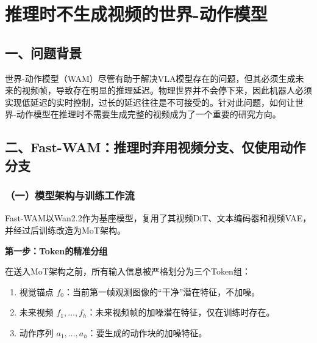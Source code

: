 \clearpage

\hypertarget{ux63a8ux7406ux65f6ux4e0dux751fux6210ux89c6ux9891ux7684ux4e16ux754c-ux52a8ux4f5cux6a21ux578b}{%
\section{推理时不生成视频的世界-动作模型}\label{ux63a8ux7406ux65f6ux4e0dux751fux6210ux89c6ux9891ux7684ux4e16ux754c-ux52a8ux4f5cux6a21ux578b}}

\hypertarget{ux4e00ux95eeux9898ux80ccux666f-10}{%
\subsection{一、问题背景}\label{ux4e00ux95eeux9898ux80ccux666f-10}}

世界-动作模型（WAM）尽管有助于解决VLA模型存在的问题，但其必须生成未来的视频帧，导致存在明显的推理延迟。物理世界并不会停下来，因此机器人必须实现低延迟的实时控制，过长的延迟往往是不可接受的。针对此问题，如何让世界-动作模型在推理时不需要生成完整的视频成为了一个重要的研究方向。

\hypertarget{ux4e8cfast-wamux63a8ux7406ux65f6ux5f03ux7528ux89c6ux9891ux5206ux652fux4ec5ux4f7fux7528ux52a8ux4f5cux5206ux652f}{%
\subsection{二、Fast-WAM：推理时弃用视频分支、仅使用动作分支}\label{ux4e8cfast-wamux63a8ux7406ux65f6ux5f03ux7528ux89c6ux9891ux5206ux652fux4ec5ux4f7fux7528ux52a8ux4f5cux5206ux652f}}

\hypertarget{ux4e00ux6a21ux578bux67b6ux6784ux4e0eux8badux7ec3ux5de5ux4f5cux6d41}{%
\subsubsection{（一）模型架构与训练工作流}\label{ux4e00ux6a21ux578bux67b6ux6784ux4e0eux8badux7ec3ux5de5ux4f5cux6d41}}

Fast-WAM以Wan2.2作为基座模型，复用了其视频DiT、文本编码器和视频VAE，并经过后训练改造为MoT架构。

\textbf{第一步：Token的精准分组}

在送入MoT架构之前，所有输入信息被严格划分为三个Token组：

\begin{enumerate}
\def\labelenumi{\arabic{enumi}.}
\tightlist
\item
  视觉锚点 \(f_0\)：当前第一帧观测图像的``干净''潜在特征，不加噪。
\item
  未来视频 \(f_1,\ldots,f_h\)：未来视频帧的加噪潜在特征，仅在训练时存在。
\item
  动作序列 \(a_1,\ldots,a_h\)：要生成的动作块的加噪特征。
\end{enumerate}

